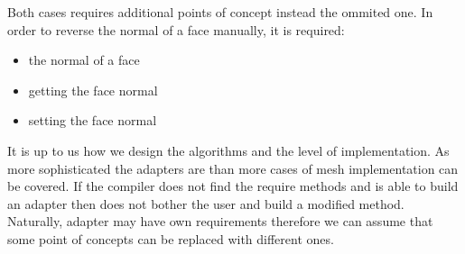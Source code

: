 Both cases requires additional points of concept instead the ommited one.
In order to reverse the normal of a face manually, it is required:

\begin{itemize}
\item the normal of a face
\item getting the face normal
\item setting the face normal
\end{itemize}

It is up to us how we design the algorithms and the level of implementation. As more sophisticated
the adapters are than more cases of mesh implementation can be covered. If the compiler does not
find the require methods and is able to build an adapter then does not bother the user and build
a modified method. Naturally, adapter may have own requirements therefore we can assume that
some point of concepts can be replaced with different ones.